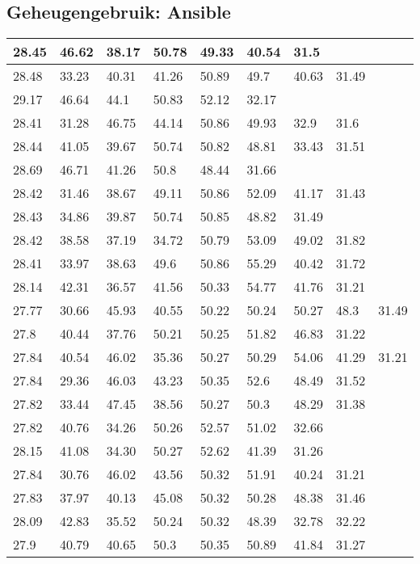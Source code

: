 \subsection*{Geheugengebruik: Ansible}
\label{dataset:deploytijden:ansible}
\begin{longtable}{ | l | l | l | l | l | l | l | l | l | }
\hline
	28.45 & 46.62 & 38.17 & 50.78 & 49.33 & 40.54 & 31.5 &  &  \\ \hline
	28.48 & 33.23 & 40.31 & 41.26 & 50.89 & 49.7 & 40.63 & 31.49 &  \\ \hline
	29.17 & 46.64 & 44.1 & 50.83 & 52.12 & 32.17 &  &  &  \\ \hline
	28.41 & 31.28 & 46.75 & 44.14 & 50.86 & 49.93 & 32.9 & 31.6 &  \\ \hline
	28.44 & 41.05 & 39.67 & 50.74 & 50.82 & 48.81 & 33.43 & 31.51 &  \\ \hline
	28.69 & 46.71 & 41.26 & 50.8 & 48.44 & 31.66 &  &  &  \\ \hline
	28.42 & 31.46 & 38.67 & 49.11 & 50.86 & 52.09 & 41.17 & 31.43 &  \\ \hline
	28.43 & 34.86 & 39.87 & 50.74 & 50.85 & 48.82 & 31.49 &  &  \\ \hline
	28.42 & 38.58 & 37.19 & 34.72 & 50.79 & 53.09 & 49.02 & 31.82 &  \\ \hline
	28.41 & 33.97 & 38.63 & 49.6 & 50.86 & 55.29 & 40.42 & 31.72 &  \\ \hline
	28.14 & 42.31 & 36.57 & 41.56 & 50.33 & 54.77 & 41.76 & 31.21 &  \\ \hline
	27.77 & 30.66 & 45.93 & 40.55 & 50.22 & 50.24 & 50.27 & 48.3 & 31.49 \\ \hline
	27.8 & 40.44 & 37.76 & 50.21 & 50.25 & 51.82 & 46.83 & 31.22 &  \\ \hline
	27.84 & 40.54 & 46.02 & 35.36 & 50.27 & 50.29 & 54.06 & 41.29 & 31.21 \\ \hline
	27.84 & 29.36 & 46.03 & 43.23 & 50.35 & 52.6 & 48.49 & 31.52 &  \\ \hline
	27.82 & 33.44 & 47.45 & 38.56 & 50.27 & 50.3 & 48.29 & 31.38 &  \\ \hline
	27.82 & 40.76 & 34.26 & 50.26 & 52.57 & 51.02 & 32.66 &  &  \\ \hline
	28.15 & 41.08 & 34.30 & 50.27 & 52.62 & 41.39 & 31.26 &  &  \\ \hline
	27.84 & 30.76 & 46.02 & 43.56 & 50.32 & 51.91 & 40.24 & 31.21 &  \\ \hline
	27.83 & 37.97 & 40.13 & 45.08 & 50.32 & 50.28 & 48.38 & 31.46 &  \\ \hline
	28.09 & 42.83 & 35.52 & 50.24 & 50.32 & 48.39 & 32.78 & 32.22 &  \\ \hline
	27.9 & 40.79 & 40.65 & 50.3 & 50.35 & 50.89 & 41.84 & 31.27 &  \\ \hline
\end{longtable}




